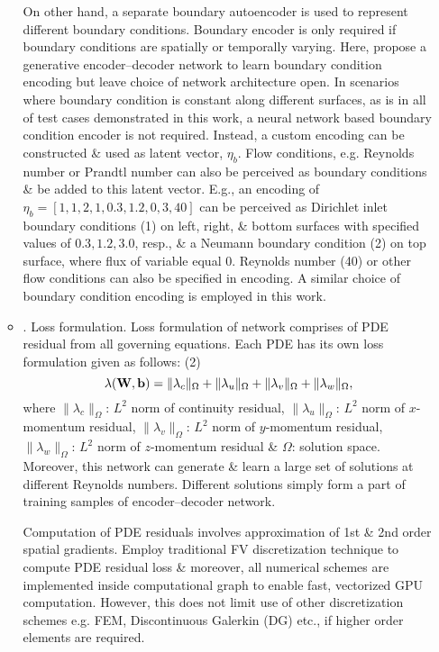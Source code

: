 \documentclass{article}
\begin{document}
\begin{itemize}
\begin{itemize}
		On other hand, a separate boundary autoencoder is used to represent different boundary conditions. Boundary encoder is only required if boundary conditions are spatially or temporally varying. Here, propose a generative encoder--decoder network to learn boundary condition encoding but leave choice of network architecture open. In scenarios where boundary condition is constant along different surfaces, as is in all of test cases demonstrated in this work, a neural network based boundary condition encoder is not required. Instead, a custom encoding can be constructed \& used as latent vector, $\eta_b$. Flow conditions, e.g. Reynolds number or Prandtl number can also be perceived as boundary conditions \& be added to this latent vector. E.g., an encoding of $\eta_b = [1,1,2,1,0.3,1.2,0,3,40]$ can be perceived as Dirichlet inlet boundary conditions (1) on left, right, \& bottom surfaces with specified values of $0.3,1.2,3.0$, resp., \& a Neumann boundary condition (2) on top surface, where flux of variable equal 0. Reynolds number (40) or other flow conditions can also be specified in encoding. A similar choice of boundary condition encoding is employed in this work.
		\item {. Loss formulation.} Loss formulation of network comprises of PDE residual from all governing equations. Each PDE has its own loss formulation given as follows: (2)
		\begin{equation}
			\lambda({\bf W},{\bf b}) = \|\lambda_c\|_\Omega + \|\lambda_u\|_\Omega + \|\lambda_v\|_\Omega + \|\lambda_w\|_\Omega,
		\end{equation}
		where $\|\lambda_c\|_\Omega$: $L^2$ norm of continuity residual, $\|\lambda_u\|_\Omega$: $L^2$ norm of $x$-momentum residual, $\|\lambda_v\|_\Omega$: $L^2$ norm of $y$-momentum residual, $\|\lambda_w\|_\Omega$: $L^2$ norm of $z$-momentum residual \& $\Omega$: solution space. Moreover, this network can generate \& learn a large set of solutions at different Reynolds numbers. Different solutions simply form a part of training samples of encoder--decoder network.
		
		Computation of PDE residuals involves approximation of 1st \& 2nd order spatial gradients. Employ traditional FV discretization technique to compute PDE residual loss \& moreover, all numerical schemes are implemented inside computational graph to enable fast, vectorized GPU computation. However, this does not limit use of other discretization schemes e.g. FEM, Discontinuous Galerkin (DG) etc., if higher order elements are required.
		

\end{itemize}
\end{itemize}
\end{document}
